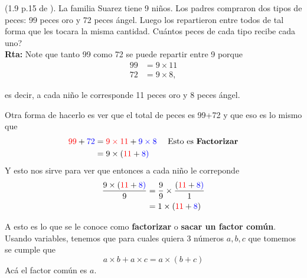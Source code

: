 \begin{ejemplo}
	(1.9 p.15 de \cite{Aops_algebra}). La familia Suarez tiene 9 niños. Los padres compraron dos tipos de peces: 99 peces oro y 72 peces ángel. Luego los repartieron entre todos de tal forma que les tocara la misma cantidad. Cuántos peces de cada tipo recibe cada uno?\\
	
	\textbf{Rta: } Note que tanto 99 como 72 se puede repartir entre 9 porque
	\begin{align*}
			99&=9\times 11\\
			72&= 9\times 8,
	\end{align*}
	
	es decir, a cada niño le corresponde 11 peces oro y 8 peces ángel. 
	
	Otra forma de hacerlo es ver que el total de peces es 	99+72 y que eso es lo mismo que 
	\begin{align*}
			\color{red}99\color{black}+\color{blue}72 &= \color{red}9\times 11 \color{black}+ \color{blue}9\times 8 & &\text{ Esto es \textbf{Factorizar}}\\				
			&= \color{black}9\times(\color{red}11\color{black}+\color{blue}8) 
	\end{align*}
	Y esto nos sirve para ver que entonces a cada niño le correponde 
	\begin{align*}
			\frac{\color{black}9\times(\color{red}11\color{black}+\color{blue}8) \color{black}}{9} &= \frac{9}{9}\times	\frac{(\color{red}11\color{black}+\color{blue}8) \color{black}}{1} \\
			&=1\times (\color{red}11\color{black}+\color{blue}8\color{black})
	\end{align*}	
\end{ejemplo}	

\begin{tcolorbox}[colback=red!5!white,colframe=red!75!black]
	A esto es lo que se le conoce como \textbf{factorizar} o \textbf{sacar un factor común}. Usando variables, tenemos que para cuales quiera 3 números $a,b,c$ que tomemos se cumple que
	\[
			a\times b + a\times c=a\times(b+c) 
	\]
	Acá el factor común es $a$.
\end{tcolorbox}


